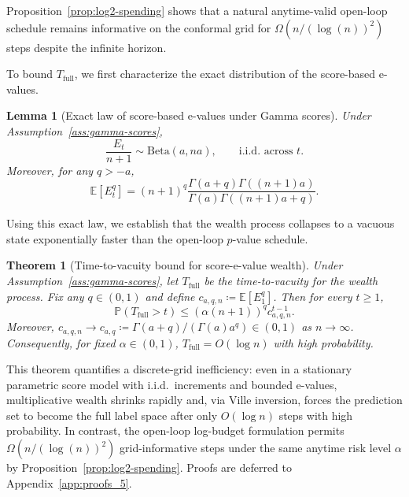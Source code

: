 \documentclass{uai2026} %
\newtheorem{theorem}{Theorem}[section]
\newtheorem{lemma}{Lemma}
\newcommand{\1}{\mathbf{1}}
\newcommand{\prob}{\mathbb{P}}
\newcommand{\expec}{\mathbb{E}}
\begin{document}
Proposition~\ref{prop:log2-spending} shows that a natural anytime-valid open-loop schedule remains informative on the conformal grid for $\Omega(n/(\log(n))^2)$ steps despite the infinite horizon.

To bound $T_{\mathrm{full}}$, we first characterize the exact distribution of the score-based e-values.

\begin{lemma}[Exact law of score-based e-values under Gamma scores]
  \label{lem:beta-law}
  Under Assumption~\ref{ass:gamma-scores},
  \begin{equation*}
    \frac{E_{t}}{n+1} \sim \mathrm{Beta}(a,na),
    \qquad \text{i.i.d.\ across }t.
  \end{equation*}
  Moreover, for any $q>-a$,
  \begin{equation}
    \label{eq:Eq-moment}
    \expec[E_{t}^q]
    =
    (n+1)^q\frac{\Gamma(a+q)\Gamma((n+1)a)}{\Gamma(a)\Gamma((n+1)a+q)}.
  \end{equation}
\end{lemma}

Using this exact law, we establish that the wealth process collapses to a vacuous state exponentially faster than the open-loop $p$-value schedule.

\begin{theorem}[Time-to-vacuity bound for score-e-value wealth]
  \label{thm:Tfull-bound}
  Under Assumption~\ref{ass:gamma-scores}, let $T_{\mathrm{full}}$ be the time-to-vacuity for the wealth process.
  Fix any $q\in(0,1)$ and define $c_{a,q,n}\coloneqq \expec[E_{1}^q]$.
  Then for every $t\ge 1$,
  \begin{equation}
    \label{eq:Tfull-tail}
    \prob(T_{\mathrm{full}}>t)
    \le (\alpha(n+1))^q c_{a,q,n}^{t-1}.
  \end{equation}
  Moreover, $c_{a,q,n}\to c_{a,q}\coloneqq \Gamma(a+q)/(\Gamma(a)a^q) \in (0,1)$ as $n\to\infty$.
  Consequently, for fixed $\alpha\in(0,1)$, $T_{\mathrm{full}}=O(\log n)$ with high probability.
\end{theorem}

This theorem quantifies a discrete-grid inefficiency: even in a stationary parametric score model with i.i.d.\ increments and bounded e-values, multiplicative wealth shrinks rapidly and, via Ville inversion, forces the prediction set to become the full label space after only $O(\log n)$ steps with high probability.
In contrast, the open-loop log-budget formulation permits $\Omega(n/(\log(n))^2)$ grid-informative steps under the same anytime risk level $\alpha$ by Proposition~\ref{prop:log2-spending}.
Proofs are deferred to Appendix~\ref{app:proofs_5}.
\end{document}
